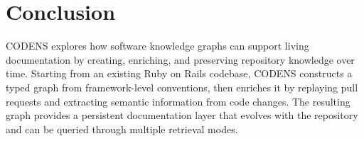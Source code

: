 \documentclass[sigconf]{acmart}
\begin{document}
\section{Conclusion}

CODENS explores how software knowledge graphs can support living documentation by creating, enriching, and preserving repository knowledge over time. 
Starting from an existing Ruby on Rails codebase, CODENS constructs a typed graph from framework-level conventions, then enriches it by replaying pull requests and extracting semantic information from code changes. 
The resulting graph provides a persistent documentation layer that evolves with the repository and can be queried through multiple retrieval modes.
\end{document}
